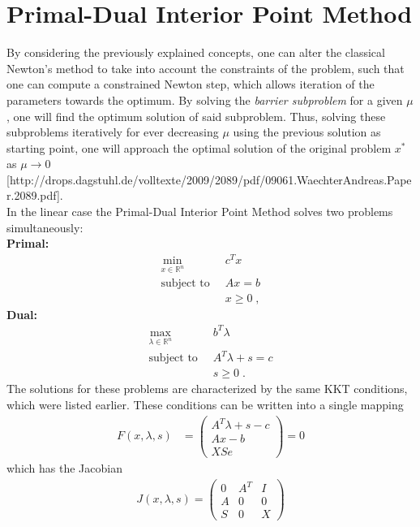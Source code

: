 \section{Primal-Dual Interior Point Method}
By considering the previously explained concepts, one can alter the classical Newton's method to take into account the constraints of the problem, such that one can compute a constrained Newton step, which allows iteration of the parameters towards the optimum.
By solving the \textit{barrier subproblem} for a given $\mu$, one will find the optimum solution of said subproblem. Thus, solving these subproblems iteratively for ever decreasing $\mu$ using the previous solution as starting point, one will approach the optimal solution of the original problem $x^*$ as $\mu \to 0$ [http://drops.dagstuhl.de/volltexte/2009/2089/pdf/09061.WaechterAndreas.Paper.2089.pdf].\\
In the linear case the Primal-Dual Interior Point Method solves two problems  simultaneously:\\
\textbf{Primal:}
 \begin{align*}
	\min_{x \in \mathbb{R}^n} \;  & \; c^T x \\
	\text{subject to} \;  & \; A x = b  \\
							& \; x \geq 0 \; ,
\end{align*}
\textbf{Dual:} 
\begin{align*}
	\max_{\lambda \in \mathbb{R}^n} \;  & \; b^T \lambda \\
	\text{subject to} \;  & \; A^T \lambda + s = c  \\
							& \; s \geq 0 \; .
\end{align*}
The solutions for these problems are characterized by the same KKT conditions, which were listed earlier. These conditions can be written into a single mapping
 \begin{align}
    F(x , \lambda, s) &= \begin{pmatrix}
           A^T \lambda + s - c \\
           A x - b \\
           X S e
         \end{pmatrix} = 0
  \end{align}
  which has the Jacobian
 \begin{align}
    J(x , \lambda, s) = \begin{pmatrix}
           0 & A^T & I	\\
           A & 0 & 0 	\\
           S & 0 & X
         \end{pmatrix}
  \end{align}
